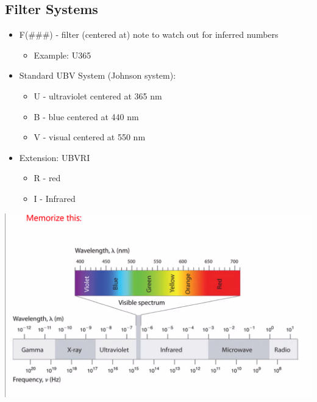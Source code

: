 \documentclass{book}
\begin{document}
\subsection{Filter Systems}
\begin{itemize}
    \item F(\#\#\#) - filter (centered at) note to watch out for inferred numbers
          \begin{itemize}
              \item Example: U365
          \end{itemize}
    \item Standard UBV System (Johnson system):
          \begin{itemize}
              \item U - ultraviolet centered at 365 nm
              \item B - blue centered at 440 nm
              \item V - visual centered at 550 nm
          \end{itemize}
    \item Extension: UBVRI
          \begin{itemize}
              \item R - red
              \item I - Infrared
          \end{itemize}
\end{itemize}
\begin{center}
    \includegraphics[height = 0.45\textwidth]{images/emspectrum.png}
\end{center}
\end{document}
